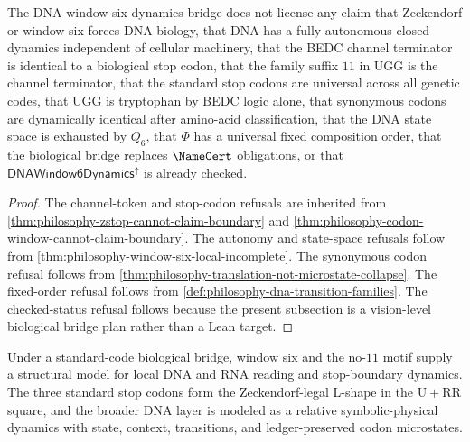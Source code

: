 \begin{theorem}
\label{thm:philosophy-dynamic-bridge-cannot-claim-boundary}
The DNA window-six dynamics bridge does not license any claim that
Zeckendorf or window six forces DNA biology, that DNA has a fully
autonomous closed dynamics independent of cellular machinery, that the
BEDC channel terminator is identical to a biological stop codon, that
the family suffix $11$ in $\mathrm{UGG}$ is the channel terminator, that
the standard stop codons are universal across all genetic codes, that
$\mathrm{UGG}$ is tryptophan by BEDC logic alone, that synonymous codons
are dynamically identical after amino-acid classification, that the DNA
state space is exhausted by $Q_{6}$, that $\Phi$ has a universal fixed
composition order, that the biological bridge replaces
$\NameCert$ obligations, or that
$\mathsf{DNAWindow6Dynamics}^{\uparrow}$ is already checked.
\end{theorem}
\begin{proof}
The channel-token and stop-codon refusals are inherited from
\autoref{thm:philosophy-zstop-cannot-claim-boundary} and
\autoref{thm:philosophy-codon-window-cannot-claim-boundary}. The
autonomy and state-space refusals follow from
\autoref{thm:philosophy-window-six-local-incomplete}. The synonymous
codon refusal follows from
\autoref{thm:philosophy-translation-not-microstate-collapse}. The
fixed-order refusal follows from
\autoref{def:philosophy-dna-transition-families}. The checked-status
refusal follows because the present subsection is a vision-level
biological bridge plan rather than a Lean target.
\end{proof}

\begin{corollary}
\label{cor:philosophy-dynamic-bridge-allowed-claim}
Under a standard-code biological bridge, window six and the no-$11$
motif supply a structural model for local DNA and RNA reading and
stop-boundary dynamics. The three standard stop codons form the
Zeckendorf-legal L-shape in the $\mathrm{U}+\mathrm{RR}$ square, and the
broader DNA layer is modeled as a relative symbolic-physical dynamics
with state, context, transitions, and ledger-preserved codon
microstates.
\end{corollary}

